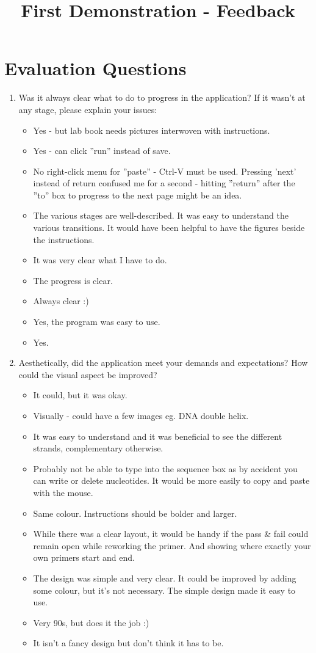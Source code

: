 \documentclass[a4paper]{article}
\title{First Demonstration - Feedback}
\begin{document}
\maketitle
\section{Evaluation Questions}
\begin{enumerate}
	\item{Was it always clear what to do to progress in the application? If it wasn't at any stage, please explain your issues:}
	\begin{itemize}
		\item{Yes - but lab book needs pictures interwoven with instructions.}
		\item{Yes - can click ''run'' instead of save.}
		\item{No right-click menu for ''paste'' - Ctrl-V must be used. Pressing 'next' instead of return confused me for a
				second - hitting ''return'' after the ''to'' box to progress to the next page might be an idea.}
		\item{The various stages are well-described. It was easy to understand the various transitions. It would have been
				helpful to have the figures beside the instructions.}
		\item{It was very clear what I have to do.}
		\item{The progress is clear.}	
		\item{Always clear :)}
		\item{Yes, the program was easy to use.}
		\item{Yes.}
	\end{itemize}
	
	\item{Aesthetically, did the application meet your demands and expectations? How could the visual aspect be improved?}
	\begin{itemize}
		\item{It could, but it was okay.}
		\item{Visually - could have a few images eg. DNA double helix.}
		\item{It was easy to understand and it was beneficial to see the different strands, complementary otherwise.}
		\item{Probably not be able to type into the sequence box as by accident you can write or delete nucleotides. It would
				be more easily to copy and paste with the mouse.}
		\item{Same colour. Instructions should be bolder and larger.}
		\item{While there was a clear layout, it would be handy if the pass  \& fail could remain open while reworking the
				primer. And showing where exactly your own primers start and end.}
		\item{The design was simple and very clear. It could be improved by adding some colour, but it's not necessary.
				The simple design made it easy to use.}
		\item{Very 90s, but does it the job :)}
		\item{It isn't a fancy design but don't think it has to be.}
	\end{itemize}
	

\end{enumerate}
\end{document}

